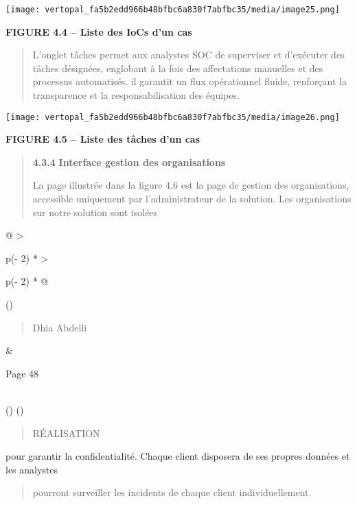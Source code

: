 \documentclass[
]{article}
\begin{document}
\texttt{[image: vertopal\_fa5b2edd966b48bfbc6a830f7abfbc35/media/image25.png]}

\textbf{FIGURE 4.4 -- Liste des IoCs d'un cas}

\begin{quote}
L'onglet tâches permet aux analystes SOC de superviser et d'exécuter des
tâches désignées, englobant à la fois des affectations manuelles et des
processus automatisés. il garantit un flux opérationnel fluide,
renforçant la transparence et la responsabilisation des équipes.
\end{quote}

\texttt{[image: vertopal\_fa5b2edd966b48bfbc6a830f7abfbc35/media/image26.png]}

\textbf{FIGURE 4.5 -- Liste des tâches d'un cas}

\begin{quote}
\textbf{4.3.4} \textbf{Interface gestion des organisations}

La page illustrée dans la figure 4.6 est la page de gestion des
organisations, accessible uniquement par l'administrateur de la
solution. Les organisations sur notre solution sont isolées
\end{quote}

\begin{longtable}[]{@{}
  >{\raggedright\arraybackslash}p{(\columnwidth - 2\tabcolsep) * }
  >{\raggedright\arraybackslash}p{(\columnwidth - 2\tabcolsep) * }@{}}
\toprule()
\begin{minipage}[b]{\linewidth}\raggedright
\begin{quote}
Dhia Abdelli
\end{quote}
\end{minipage} & \begin{minipage}[b]{\linewidth}\raggedright
Page 48
\end{minipage} \\
\midrule()
\endhead
\bottomrule()
\end{longtable}

\begin{quote}
RÉALISATION
\end{quote}

pour garantir la confidentialité. Chaque client disposera de ses propres
données et les analystes

\begin{quote}
pourront surveiller les incidents de chaque client individuellement.
\end{quote}
\end{document}
